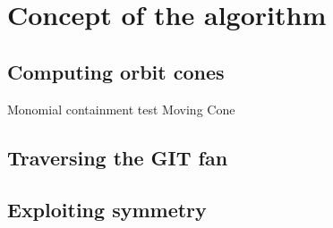 \chapter{Concept of the algorithm}
\label{chap:algorithm}

\label{algorithm:main}

\section{Computing orbit cones}
Monomial containment test
Moving Cone
\section{Traversing the GIT fan}
\section{Exploiting symmetry}